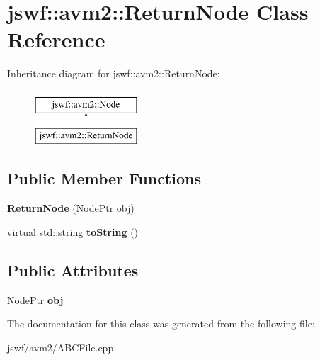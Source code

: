 \hypertarget{classjswf_1_1avm2_1_1_return_node}{\section{jswf\+:\+:avm2\+:\+:Return\+Node Class Reference}
\label{classjswf_1_1avm2_1_1_return_node}
}
Inheritance diagram for jswf\+:\+:avm2\+:\+:Return\+Node\+:\begin{figure}[H]
\begin{center}
\leavevmode
\includegraphics[height=2.000000cm]{classjswf_1_1avm2_1_1_return_node}
\end{center}
\end{figure}
\subsection*{Public Member Functions}
\begin{DoxyCompactItemize}
\item 
\hypertarget{classjswf_1_1avm2_1_1_return_node_a72ccce5864c108ec21bdb576c1d76432}{{\bfseries Return\+Node} (Node\+Ptr obj)}\label{classjswf_1_1avm2_1_1_return_node_a72ccce5864c108ec21bdb576c1d76432}

\item 
\hypertarget{classjswf_1_1avm2_1_1_return_node_a56702089f31ee8277d817da0dc6257c7}{virtual std\+::string {\bfseries to\+String} ()}\label{classjswf_1_1avm2_1_1_return_node_a56702089f31ee8277d817da0dc6257c7}

\end{DoxyCompactItemize}
\subsection*{Public Attributes}
\begin{DoxyCompactItemize}
\item 
\hypertarget{classjswf_1_1avm2_1_1_return_node_acb13c27ebc43dc135909f4aa5cd3ac4f}{Node\+Ptr {\bfseries obj}}\label{classjswf_1_1avm2_1_1_return_node_acb13c27ebc43dc135909f4aa5cd3ac4f}

\end{DoxyCompactItemize}


The documentation for this class was generated from the following file\+:\begin{DoxyCompactItemize}
\item 
jswf/avm2/A\+B\+C\+File.\+cpp\end{DoxyCompactItemize}

